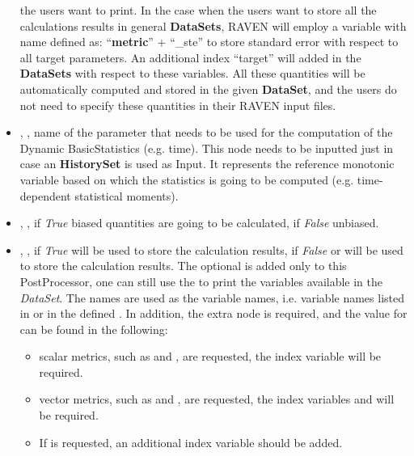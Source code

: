 \begin{itemize}
  the users want to print.
  In the case when the users want to store all the calculations results in general \textbf{DataSets}, RAVEN will employ a variable
  with name defined as: ``\textbf{metric}'' + ``\_ste'' to store standard error with respect to all target parameters. An additional
  index ``target'' will added in the \textbf{DataSets} with respect to these variables. All these quantities will be automatically
  computed and stored in the given \textbf{DataSet}, and the users do not need to specify these quantities in their RAVEN input files.
   \item {}, , name of the parameter that needs
   to be used for the computation of the Dynamic BasicStatistics (e.g. time). This node needs to
   be inputted just in case an \textbf{HistorySet} is used as Input. It represents the reference
   monotonic variable based on which the statistics is going to be computed (e.g. time-dependent
   statistical moments).
  \item {}, , if \textit{True} biased
  quantities are going to be calculated, if \textit{False} unbiased.
  \item {}, , if \textit{True} 
    will be used to store the calculation results, if \textit{False}  or 
    will be used to store the calculation results.
    \nb The optional  is added only to this PostProcessor, one can still use the 
    to print the variables available in the \textit{DataSet}. The  names are used as the
    variable names, i.e. variable names listed in  or  in the defined .
    In addition, the extra node  is required, and the value for  can be found in the following:
    \begin{itemize}
      \item scalar metrics, such as  and ,
        are requested, the index variable  will be required.
      \item vector metrics, such as  and , are requested, the index variables
         and  will be required.
      \item If  is requested, an additional index variable  should be added.

\end{itemize}
\end{itemize}
